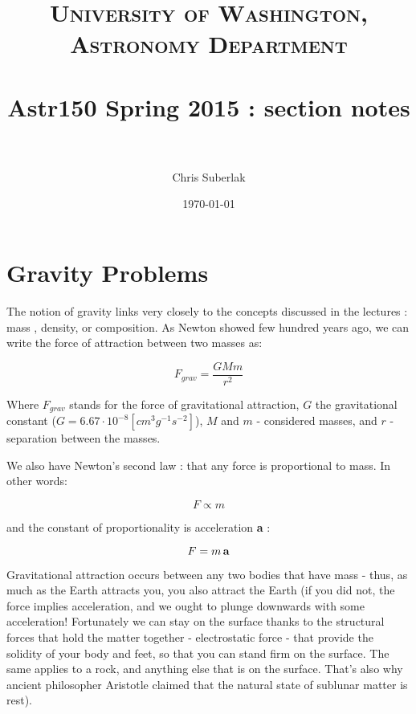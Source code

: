 \documentclass[paper=a4, fontsize=11pt]{scrartcl} %
\title{	
\normalfont \normalsize 
\textsc{University of Washington, Astronomy Department} \\ [25pt] 
\horrule{0.5pt} \\[0.4cm] %
\huge Astr150 Spring 2015 : section notes \\ %
\horrule{2pt} \\[0.5cm] %
}
\author{Chris Suberlak}
\date{\normalsize\today}
\numberwithin{equation}{section} %
\begin{document}
\maketitle %


\section{Gravity Problems }

The notion of gravity links very closely to the concepts discussed in the lectures : mass , density, or composition. 
As Newton showed few hundred years ago, we can write the force of attraction between two masses as: 

\begin{equation}
 F_{grav} = \frac{G M m}{r^{2}}
 \label{eq:gravity}
\end{equation}

Where $F_{grav}$ stands for the force of gravitational attraction, $G$ the gravitational constant ($G = 6.67 \cdot 10^{-8} [cm^{3}g^{-1}s^{-2}]$), $M$ and $m$ - considered masses, and $r$ - separation between the masses. 

We also have Newton's second law  : that any force is proportional to mass. In other words: 

\begin{equation}
F \propto m
\end{equation}

and the constant of proportionality is acceleration \textbf{a} : 

\begin{equation}
\label{newtons}
F = m \, \bold{a}
\end{equation}

Gravitational attraction occurs between any two bodies that have mass - thus, as much as the Earth attracts you, you also attract the Earth (if you did not, the force implies acceleration, and we ought to plunge downwards with some acceleration! Fortunately we can stay on the surface thanks to the structural forces that hold the matter together - electrostatic force - that provide the solidity of your body and feet, so that you can stand firm on the surface. The same applies to a rock, and anything else that is on the surface. That's also why ancient philosopher Aristotle claimed that the natural state of sublunar matter is rest). 
\end{document}
